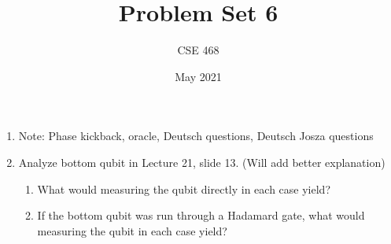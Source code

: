 \documentclass[12pt]{article}
\title{Problem Set 6}
\author{CSE 468}
\date{May 2021}
\begin{document}
\maketitle



\begin{enumerate}[font=\bfseries]

    \item Note: Phase kickback, oracle, Deutsch questions, Deutsch Josza questions
    \item Analyze bottom qubit in Lecture 21, slide 13. (Will add better explanation)
    \begin{enumerate}
        \item What would measuring the qubit directly in each case yield?
        \item If the bottom qubit was run through a Hadamard gate, what would measuring the qubit in each case yield?
    \end{enumerate}
    
    
\end{enumerate}
\end{document}

